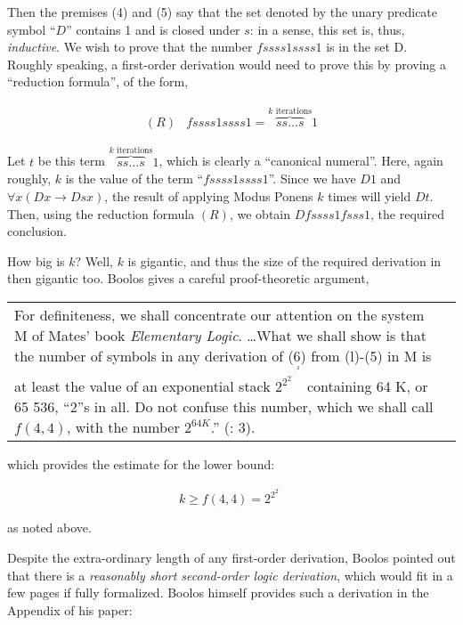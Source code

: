 \documentclass[11pt,a4paper]{article}
\newcommand{\be}{\begin{equation}}
\newcommand{\ee}{\end{equation}}
\newcommand{\beq}{\begin{eqnarray}}
\newcommand{\eeq}{\end{eqnarray}}
\newcommand{\bt}[2]{\small \begin{center}\begin{tabular}{p{#1 cm}p{#2 cm}}}
\def\et{\end{tabular}\end{center}\normalsize}
\theoremstyle{definition}
\begin{document}
Then the premises (4) and (5) say that the set denoted by the unary predicate symbol ``$D$'' contains 1 and is closed under $s$: in a sense, this set is, thus, \emph{inductive}. We wish to prove that the number $f ssss1 ssss1$ is in the set D. Roughly speaking, a first-order derivation would need to prove this by proving a ``reduction formula'', of the form,

\beq
(R) & f ssss1 ssss1 = \overbrace{s s \dots s}^{k \text{ iterations}}1
\eeq 

Let $t$ be this term $\overbrace{s s \dots s}^{k \text{ iterations}}1$, which is clearly a ``canonical numeral''. Here, again roughly, $k$ is the value of the term ``$f ssss1 ssss1$''. Since we have $D 1$ and $\forall x(D x \to D sx)$, the result of applying Modus Ponens $k$ times will yield $D t$. Then, using the reduction formula $(R)$, we obtain $D f ssss1 fsss1$, the required conclusion. 

How big is $k$? Well, $k$ is gigantic, and thus the size of the required derivation in then gigantic too. Boolos gives a careful proof-theoretic argument,
\bt{12}{0}
For definiteness, we shall concentrate our attention on the system
M of Mates' book \emph{Elementary Logic}. \dots What we shall show is that the number of symbols in any derivation of (6) from (l)-(5) in M is at least the value of an exponential stack $2^{2^{2^{.^{.^{.^{.^{2}}}}}}}$ containing 64 K, or 65 536, “2”s in all. Do not confuse this number, which we shall call $f(4, 4)$, with the number $2^{64 K}$.'' (\cite{boo87}: 3).
\et

which provides the estimate for the lower bound:

\be
k \geq f(4,4) = 2^{2^{2^{.^{.^{.^{.^{2}}}}}}}
\ee

as noted above. 
 
Despite the extra-ordinary length of any first-order derivation, Boolos pointed out that there is a \emph{reasonably short second-order logic derivation}, which would fit in a few pages if fully formalized. Boolos himself provides such a derivation in the Appendix of his paper:
\end{document}
